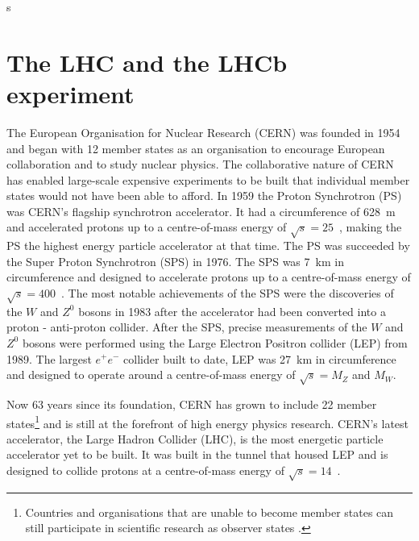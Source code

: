 s\chapter{{\bf The LHC and the LHCb experiment}}
\label{CERN_LHC_LHCb}

The European Organisation for Nuclear Research (CERN) was founded in 1954 and began with 12 member states as an organisation to encourage European collaboration and to study nuclear physics. The collaborative nature of CERN has enabled large-scale expensive experiments to be built that individual member states would not have been able to afford. In 1959 the Proton Synchrotron (PS) was CERN's flagship synchrotron accelerator. It had a circumference of 628~m and accelerated protons up to a centre-of-mass energy of $\sqrt{s} = 25$~\gev, making the PS the highest energy particle accelerator at that time. 
The PS was succeeded by the Super Proton Synchrotron (SPS) in 1976. The SPS was 7~km in circumference and designed to accelerate protons up to a centre-of-mass energy of $\sqrt{s} = 400$~\gev. The most notable achievements of the SPS were the discoveries of the $W$ and $Z^0$ bosons in 1983 after the accelerator had been converted into a proton - anti-proton collider. After the SPS, precise measurements of the $W$ and $Z^0$ bosons were performed using the Large Electron Positron collider (LEP) from 1989. The largest $e^+e^-$ collider built to date, LEP was 27~km in circumference and designed to operate around a centre-of-mass energy of $\sqrt{s} = M_{Z}$ and $M_{W}$. %

Now 63 years since its foundation, CERN has grown to include 22 member states\footnote{Countries and organisations that are unable to become member states can still participate in scientific research as observer states \cite{Member_States}.} and is still at the forefront of high energy physics research. CERN’s latest accelerator, the Large Hadron Collider (LHC), is the most energetic particle accelerator yet to be built. It was built in the tunnel that housed LEP and is designed to collide protons at a centre-of-mass energy of $\sqrt{s} = 14$~\tev. 

